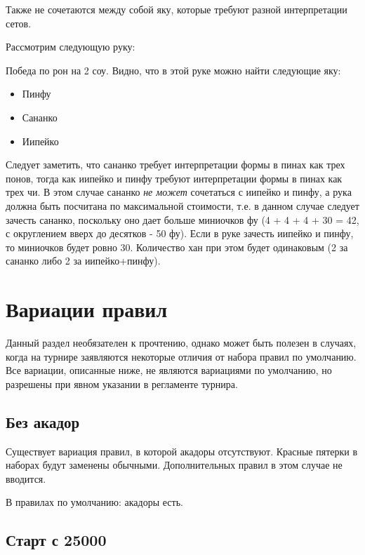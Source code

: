 Также не сочетаются между собой яку, которые требуют разной интерпретации сетов. 

\begin{example}
	
	Рассмотрим следующую руку:
	\vspace{5mm}
	
	\vspace{5mm}
	
	Победа по рон на 2 соу. Видно, что в этой руке можно найти следующие яку:
	\begin{itemize}
		\item Пинфу
		\item Сананко
		\item Иипейко
	\end{itemize}
	Следует заметить, что сананко требует интерпретации формы в пинах как трех понов, тогда как иипейко и пинфу требуют интерпретации формы в пинах как трех чи. В этом случае сананко \textit{не может} сочетаться с иипейко и пинфу, а рука должна быть посчитана по максимальной стоимости, т.е. в данном случае следует зачесть сананко, поскольку оно дает больше миниочков фу (4 + 4 + 4 + 30 = 42, с округлением вверх до десятков - 50 фу). Если в руке зачесть иипейко и пинфу, то миниочков будет ровно 30. Количество хан при этом будет одинаковым (2 за сананко либо 2 за иипейко+пинфу).
\end{example}

\section{Вариации правил}

Данный раздел необязателен к прочтению, однако может быть полезен в случаях, когда на турнире заявляются некоторые отличия от набора правил по умолчанию. Все вариации, описанные ниже, не являются вариациями по умолчанию, но разрешены при явном указании в регламенте турнира.

\subsection{Без акадор}

Существует вариация правил, в которой акадоры отсутствуют. Красные пятерки в наборах будут заменены обычными. Дополнительных правил в этом случае не вводится.

В правилах по умолчанию: акадоры есть.

\subsection{Старт с 25000}

